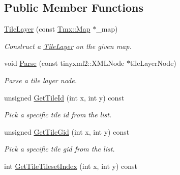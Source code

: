 \subsection*{Public Member Functions}
\begin{DoxyCompactItemize}
\item 
\hypertarget{classTmx_1_1TileLayer_a695c876d416b231bd66e19266dd64f08}{\hyperlink{classTmx_1_1TileLayer_a695c876d416b231bd66e19266dd64f08}{Tile\-Layer} (const \hyperlink{classTmx_1_1Map}{Tmx\-::\-Map} $\ast$\-\_\-map)}\label{classTmx_1_1TileLayer_a695c876d416b231bd66e19266dd64f08}

\begin{DoxyCompactList}\small\item\em Construct a \hyperlink{classTmx_1_1TileLayer}{Tile\-Layer} on the given map. \end{DoxyCompactList}\item 
\hypertarget{classTmx_1_1TileLayer_abd369d79635deab99dc03182a49e5d78}{void \hyperlink{classTmx_1_1TileLayer_abd369d79635deab99dc03182a49e5d78}{Parse} (const tinyxml2\-::\-X\-M\-L\-Node $\ast$tile\-Layer\-Node)}\label{classTmx_1_1TileLayer_abd369d79635deab99dc03182a49e5d78}

\begin{DoxyCompactList}\small\item\em Parse a tile layer node. \end{DoxyCompactList}\item 
\hypertarget{classTmx_1_1TileLayer_ae3902bf98b97d38f81a44cc634177042}{unsigned \hyperlink{classTmx_1_1TileLayer_ae3902bf98b97d38f81a44cc634177042}{Get\-Tile\-Id} (int x, int y) const }\label{classTmx_1_1TileLayer_ae3902bf98b97d38f81a44cc634177042}

\begin{DoxyCompactList}\small\item\em Pick a specific tile id from the list. \end{DoxyCompactList}\item 
\hypertarget{classTmx_1_1TileLayer_a5ca43217676bfb8b5f45847587dc4318}{unsigned \hyperlink{classTmx_1_1TileLayer_a5ca43217676bfb8b5f45847587dc4318}{Get\-Tile\-Gid} (int x, int y) const }\label{classTmx_1_1TileLayer_a5ca43217676bfb8b5f45847587dc4318}

\begin{DoxyCompactList}\small\item\em Pick a specific tile gid from the list. \end{DoxyCompactList}\item 
\hypertarget{classTmx_1_1TileLayer_a3317d70d127a4f1c3101a61f4c38b100}{int \hyperlink{classTmx_1_1TileLayer_a3317d70d127a4f1c3101a61f4c38b100}{Get\-Tile\-Tileset\-Index} (int x, int y) const }\label{classTmx_1_1TileLayer_a3317d70d127a4f1c3101a61f4c38b100}


\end{DoxyCompactItemize}
